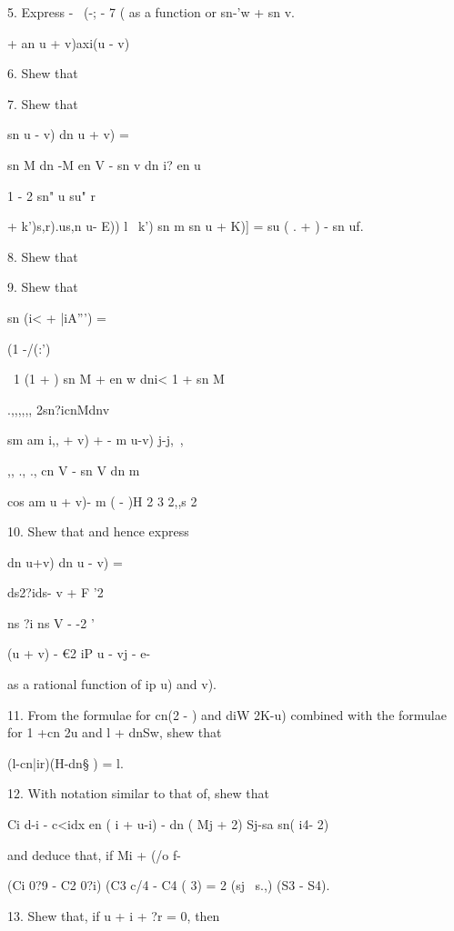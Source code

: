 5. Express - \ (-; - 7 ( as a function or sn-'w + sn v.

   + an u + v)axi(u - v)

6. Shew that

7. Shew that

sn u - v) dn u + v) =

sn M dn -M en V - sn v dn i? en u

1 - 2 sn" u su" r


    + k')s,r).us,n u- E)) l~ k') sn m sn u + K)] = su ( . + ) - sn uf.


8. Shew that

9. Shew that

sn (i< + |iA''') =

(1 -/(:')

\ 1 (1 + ) sn M + en w dni< 1 + sn M

.,,,,,, 2sn?icnMdnv

sm am i,, + v) + - m u-v) j-j,~,

,, ., ., cn V - sn V dn m

cos am u + v)- m ( - )H 2 3 2,,s 2 


10. Shew that and hence express

dn u+v) dn u - v) =

ds2?ids- v + F '2

ns ?i ns V - -2 '

(u + v) - €2 iP u - vj - e-

as a rational function of ip u) and v). 

11. From the formulae for cn(2 - ) and diW 2K-u) combined with the
formulae for 1 +cn 2u and l + dnSw, shew that

(l-cn|ir)(H-dn§ ) = l. 

12. With notation similar to that of, shew that

Ci d-i - c<idx en ( i + u-i) - dn ( Mj + 2) Sj-sa sn( i4- 2)

and deduce that, if Mi + (/o f-%

(Ci 0?9 - C2 0?i) (C3 c/4 - C4 ( 3) = 2 (sj \ s.,) (S3 - S4).


13. Shew that, if u + i + ?r = 0, then

